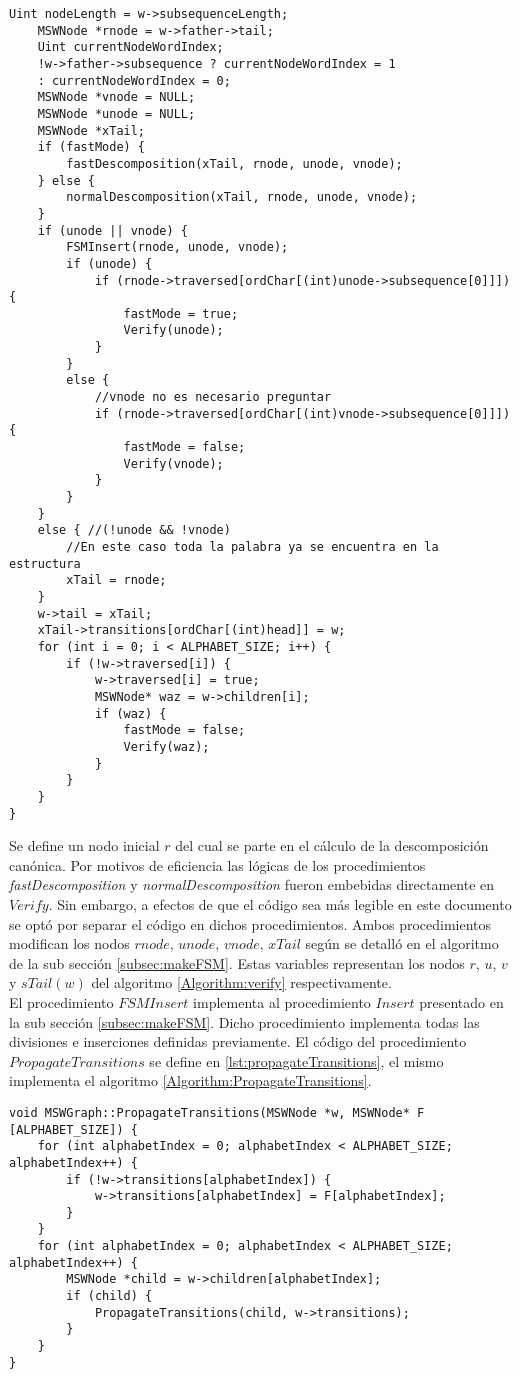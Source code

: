 \begin{lstlisting}[caption=Descomposición canónica - definiciones, label={lst:verify}]
	Uint nodeLength = w->subsequenceLength;
	MSWNode *rnode = w->father->tail;
	Uint currentNodeWordIndex;
	!w->father->subsequence ? currentNodeWordIndex = 1 
	: currentNodeWordIndex = 0;
	MSWNode *vnode = NULL;
	MSWNode *unode = NULL;
	MSWNode *xTail;
	if (fastMode) {
		fastDescomposition(xTail, rnode, unode, vnode);		
	} else {
		normalDescomposition(xTail, rnode, unode, vnode);			
	}
	if (unode || vnode) {
		FSMInsert(rnode, unode, vnode);
		if (unode) {
			if (rnode->traversed[ordChar[(int)unode->subsequence[0]]]) {
				fastMode = true;
				Verify(unode);
			}
		}
		else {
			//vnode no es necesario preguntar
			if (rnode->traversed[ordChar[(int)vnode->subsequence[0]]]) {
				fastMode = false;
				Verify(vnode);
			}
		}
	}
	else { //(!unode && !vnode)
		//En este caso toda la palabra ya se encuentra en la estructura
		xTail = rnode;
	}
	w->tail = xTail;
	xTail->transitions[ordChar[(int)head]] = w;
	for (int i = 0; i < ALPHABET_SIZE; i++) {
		if (!w->traversed[i]) {
			w->traversed[i] = true;
			MSWNode* waz = w->children[i];
			if (waz) {
				fastMode = false;
				Verify(waz);
			}
		}
	}
}
\end{lstlisting}
Se define un nodo inicial $r$ del cual se parte en el cálculo de la descomposición canónica. Por motivos de eficiencia las lógicas de los procedimientos {\it fastDescomposition} y {\it normalDescomposition} fueron embebidas directamente en $Verify$. Sin embargo, a efectos de que el código sea más legible en este documento se optó por separar el código en dichos procedimientos. Ambos procedimientos modifican los nodos $rnode$, $unode$, $vnode$, $xTail$ según se detalló en el algoritmo de la sub sección \ref{subsec:makeFSM}. Estas variables representan los nodos $r$, $u$, $v$ y $sTail(w)$ del algoritmo \ref{Algorithm:verify} respectivamente. \\ 
El procedimiento $FSMInsert$ implementa al procedimiento $Insert$ presentado en la sub sección \ref{subsec:makeFSM}. Dicho procedimiento implementa todas las divisiones e inserciones definidas previamente.
El código del procedimiento $PropagateTransitions$ se define en \ref{lst:propagateTransitions}, el mismo implementa el algoritmo  \ref{Algorithm:PropagateTransitions}.
\begin{lstlisting}[caption=Descomposición canónica - definiciones, label={lst:propagateTransitions}]
void MSWGraph::PropagateTransitions(MSWNode *w, MSWNode* F [ALPHABET_SIZE]) {
	for (int alphabetIndex = 0; alphabetIndex < ALPHABET_SIZE; alphabetIndex++) {
		if (!w->transitions[alphabetIndex]) {
            w->transitions[alphabetIndex] = F[alphabetIndex];
        }
	}
	for (int alphabetIndex = 0; alphabetIndex < ALPHABET_SIZE; alphabetIndex++) {
		MSWNode *child = w->children[alphabetIndex];
		if (child) {
			PropagateTransitions(child, w->transitions);
        }
	}
}
\end{lstlisting}

